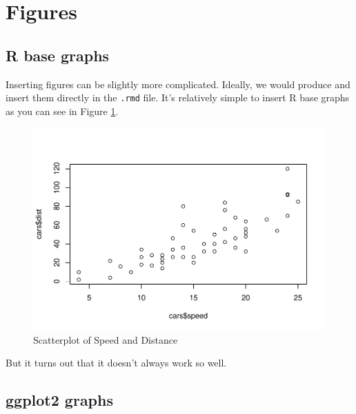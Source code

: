 \documentclass[
  12pt,
]{article}
\newenvironment{Shaded}{\begin{snugshade}}{\end{snugshade}}
\newcommand{\KeywordTok}[1]{\textcolor[rgb]{0.13,0.29,0.53}{\textbf{#1}}}
\newcommand{\NormalTok}[1]{#1}
\newcommand{\OperatorTok}[1]{\textcolor[rgb]{0.81,0.36,0.00}{\textbf{#1}}}
\begin{document}
\hypertarget{figures}{%
\section{Figures}\label{figures}}

\hypertarget{r-base-graphs}{%
\subsection{R base graphs}\label{r-base-graphs}}

Inserting figures can be slightly more complicated. Ideally, we would produce and insert them directly in the \texttt{.rmd} file. It's relatively simple to insert R base graphs as you can see in Figure \ref{fig:fig-1}.

\begin{Shaded}
\end{Shaded}

\begin{figure}[H]

{\centering \includegraphics{paper_files/figure-latex/fig-1-1} 

}

\caption{Scatterplot of Speed and Distance}\label{fig:fig-1}
\end{figure}

But it turns out that it doesn't always work so well.

\hypertarget{ggplot2-graphs}{%
\subsection{ggplot2 graphs}\label{ggplot2-graphs}}
\end{document}
